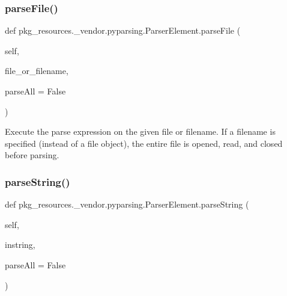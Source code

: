\subsubsection{\texorpdfstring{parse\+File()}{parseFile()}}
{\footnotesize\ttfamily def pkg\+\_\+resources.\+\_\+vendor.\+pyparsing.\+Parser\+Element.\+parse\+File (\begin{DoxyParamCaption}\item[{}]{self,  }\item[{}]{file\+\_\+or\+\_\+filename,  }\item[{}]{parse\+All = {\ttfamily False} }\end{DoxyParamCaption})}

\begin{DoxyVerb}Execute the parse expression on the given file or filename.
If a filename is specified (instead of a file object),
the entire file is opened, read, and closed before parsing.
\end{DoxyVerb}
 \mbox{\label{classpkg__resources_1_1__vendor_1_1pyparsing_1_1_parser_element_a10680bb4fd394b631357d464b399e63a}} 
\subsubsection{\texorpdfstring{parse\+String()}{parseString()}}
{\footnotesize\ttfamily def pkg\+\_\+resources.\+\_\+vendor.\+pyparsing.\+Parser\+Element.\+parse\+String (\begin{DoxyParamCaption}\item[{}]{self,  }\item[{}]{instring,  }\item[{}]{parse\+All = {\ttfamily False} }\end{DoxyParamCaption})}

